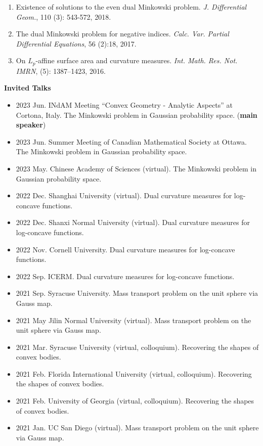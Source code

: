 \documentclass[12pt]{article}
\theoremstyle{plain} \numberwithin{equation}{section}
\theoremstyle{definition}
\begin{document}
\begin{enumerate}
\item Existence of solutions to the even dual Minkowski problem. \textit{J. Differential Geom.}, 110 (3): 543-572, 2018.

\item The dual {M}inkowski problem for negative indices. \textit{Calc. Var. Partial Differential Equations}, 56 (2):18, 2017.

\item On {$L_p$}-affine surface area and curvature measures. \textit{Int. Math. Res. Not. IMRN}, (5): 1387--1423, 2016.



\end{enumerate}

{\large\textbf{Invited Talks}}
\begin{itemize}
\item 2023 Jun. INdAM Meeting ``Convex Geometry - Analytic Aspects'' at Cortona, Italy. The Minkowski problem in Gaussian probability space. (\textbf{main speaker})
\item 2023 Jun. Summer Meeting of Canadian Mathematical Society at Ottawa. The Minkowski problem in Gaussian probability space.
\item 2023 May. Chinese Academy of Sciences (virtual). The Minkowski problem in Gaussian probability space.
\item 2022 Dec. Shanghai University (virtual). Dual curvature measures for log-concave functions.
\item 2022 Dec. Shanxi Normal University (virtual). Dual curvature measures for log-concave functions.
\item 2022 Nov. Cornell University. Dual curvature measures for log-concave functions.
\item 2022 Sep. ICERM. Dual curvature measures for log-concave functions.
\item 2021 Sep. Syracuse University. Mass transport problem on the unit sphere via Gauss map.
\item 2021 May  Jilin Normal University (virtual). Mass transport problem on the unit sphere via Gauss map.
\item 2021 Mar. Syracuse University (virtual, colloquium). Recovering the shapes of convex bodies.
\item 2021 Feb. Florida International University (virtual, colloquium). Recovering the shapes of convex bodies.
\item 2021 Feb. University of Georgia (virtual, colloquium). Recovering the shapes of convex bodies.
\item 2021 Jan. UC San Diego (virtual).  Mass transport problem on the unit sphere via Gauss map. 

\end{itemize}
\end{document}
